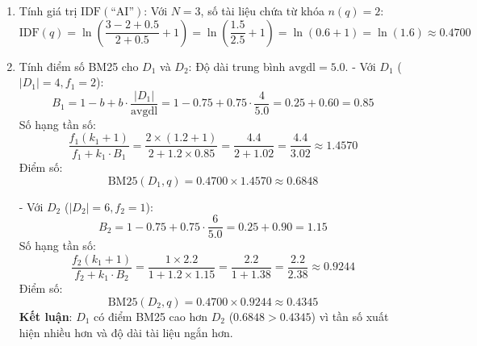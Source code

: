 \begin{enumerate}
  \item Tính giá trị $\text{IDF}(\text{``AI''})$:
  Với $N = 3$, số tài liệu chứa từ khóa $n(q) = 2$:
  \begin{equation*}
  \text{IDF}(q) = \ln \left( \frac{3 - 2 + 0.5}{2 + 0.5} + 1 \right) = \ln \left( \frac{1.5}{2.5} + 1 \right) = \ln (0.6 + 1) = \ln(1.6) \approx \mathbf{0.4700}
  \end{equation*}

  \item Tính điểm số BM25 cho $D_1$ và $D_2$:
  Độ dài trung bình $\text{avgdl} = 5.0$.
  - Với $D_1$ ($|D_1| = 4, f_1 = 2$):
  \begin{equation*}
  B_1 = 1 - b + b \cdot \frac{|D_1|}{\text{avgdl}} = 1 - 0.75 + 0.75 \cdot \frac{4}{5.0} = 0.25 + 0.60 = 0.85
  \end{equation*}
  Số hạng tần số:
  \begin{equation*}
  \frac{f_1 (k_1 + 1)}{f_1 + k_1 \cdot B_1} = \frac{2 \times (1.2 + 1)}{2 + 1.2 \times 0.85} = \frac{4.4}{2 + 1.02} = \frac{4.4}{3.02} \approx 1.4570
  \end{equation*}
  Điểm số:
  \begin{equation*}
  \text{BM25}(D_1, q) = 0.4700 \times 1.4570 \approx \mathbf{0.6848}
  \end{equation*}

  - Với $D_2$ ($|D_2| = 6, f_2 = 1$):
  \begin{equation*}
  B_2 = 1 - 0.75 + 0.75 \cdot \frac{6}{5.0} = 0.25 + 0.90 = 1.15
  \end{equation*}
  Số hạng tần số:
  \begin{equation*}
  \frac{f_2 (k_1 + 1)}{f_2 + k_1 \cdot B_2} = \frac{1 \times 2.2}{1 + 1.2 \times 1.15} = \frac{2.2}{1 + 1.38} = \frac{2.2}{2.38} \approx 0.9244
  \end{equation*}
  Điểm số:
  \begin{equation*}
  \text{BM25}(D_2, q) = 0.4700 \times 0.9244 \approx \mathbf{0.4345}
  \end{equation*}
  \textbf{Kết luận}: $D_1$ có điểm BM25 cao hơn $D_2$ ($0.6848 > 0.4345$) vì tần số xuất hiện nhiều hơn và độ dài tài liệu ngắn hơn.
\end{enumerate}

